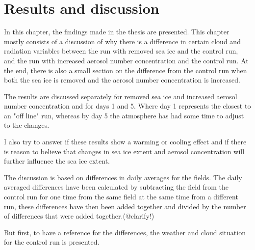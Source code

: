 \chapter{Results and discussion}
\label{chap:results}
In this chapter, the findings made in the thesis are presented. This chapter mostly consists of a discussion of why there is a difference in certain cloud and radiation variables between the run with removed sea ice and the control run, and the run with increased aerosol number concentration and the control run. At the end, there is also a small section on the difference from the control run when both the sea ice is removed and the aerosol number concentration is increased.

The results are discussed separately for removed sea ice and increased aerosol number concentration and for days 1 and 5. Where day 1 represents the closest to an "off line" run, whereas by day 5 the atmosphere has had some time to adjust to the changes.%

I also try to answer if these results show a warming or cooling effect and if there is reason to believe that changes in sea ice extent and aerosol concentration will further influence the sea ice extent.

The discussion is based on differences in daily averages for the fields. The daily averaged differences have been calculated by subtracting the field from the control run for one time from the same field at the same time from a different run, these differences have then been added together and divided by the number of differences that were added together.(@clarify!)

But first, to have a reference for the differences, the weather and cloud situation for the control run is presented.

